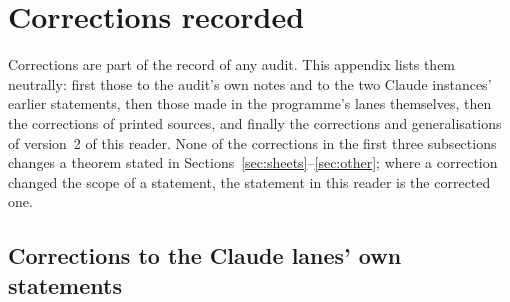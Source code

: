 \section{Corrections recorded}\label{app:corrections}

Corrections are part of the record of any audit. This appendix lists them neutrally: first those to the audit's own notes and to the two Claude instances' earlier statements, then those made in the programme's lanes themselves, then the corrections of printed sources, and finally the corrections and generalisations of version~2 of this reader. None of the corrections in the first three subsections changes a theorem stated in Sections~\ref{sec:sheets}--\ref{sec:other}; where a correction changed the scope of a statement, the statement in this reader is the corrected one.

\subsection{Corrections to the Claude lanes' own statements}

